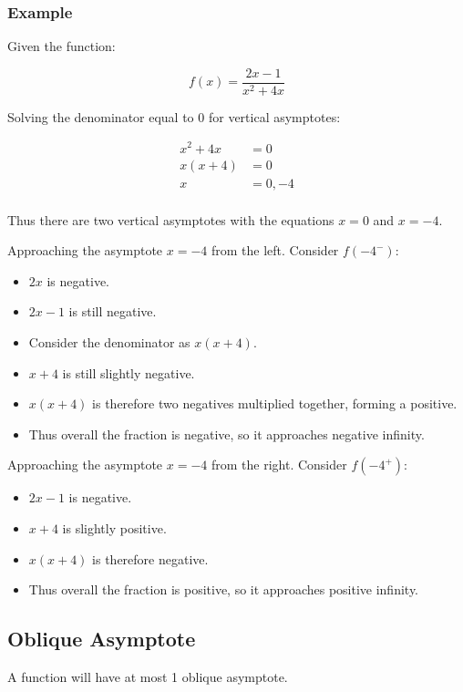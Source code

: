 \documentclass[a4paper,11pt]{article}
\begin{document}
\subsubsection{Example}

Given the function:

$$
f(x) = \frac{2x - 1}{x^2 + 4x}
$$

Solving the denominator equal to 0 for vertical asymptotes:

$$
\begin{aligned}
x^2 + 4x & = 0 \\
x(x + 4) & = 0 \\
x & = 0, -4 \\
\end{aligned}
$$

Thus there are two vertical asymptotes with the equations $x = 0$ and $x = -4$.

Approaching the asymptote $x = -4$ from the left. Consider $f(-4^-)$:

\begin{itemize}
\item $2x$ is negative.
\item $2x - 1$ is still negative.
\item Consider the denominator as $x(x + 4)$.
\item $x + 4$ is still slightly negative.
\item $x(x + 4)$ is therefore two negatives multiplied together, forming a
	positive.
\item Thus overall the fraction is negative, so it approaches negative infinity.
\end{itemize}

Approaching the asymptote $x = -4$ from the right. Consider $f(-4^+)$:

\begin{itemize}
\item $2x - 1$ is negative.
\item $x + 4$ is slightly positive.
\item $x(x + 4)$ is therefore negative.
\item Thus overall the fraction is positive, so it approaches positive infinity.
\end{itemize}


\subsection{Oblique Asymptote}

A function will have at most 1 oblique asymptote.
\end{document}

